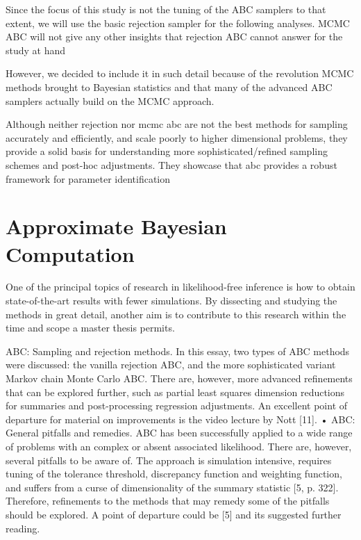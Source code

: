 Since the focus of this study is not the tuning of the ABC samplers to that extent, we will use the basic rejection sampler for the following analyses. MCMC ABC will not give any other insights that rejection ABC cannot answer for the study at hand 

However, we decided to include it in such detail because of the revolution MCMC methods brought to Bayesian statistics and that many of the advanced ABC samplers actually build on the MCMC approach. 

Although neither rejection nor mcmc abc are not the best methods for sampling accurately and efficiently, and scale poorly to higher dimensional problems, they provide a solid basis for understanding more sophisticated/refined sampling schemes and post-hoc adjustments. They showcase that abc provides a robust framework for parameter identification

\section{Approximate Bayesian Computation}

One of the principal topics of research in likelihood-free inference is how to obtain state-of-the-art results with fewer simulations. By dissecting and studying the methods in great detail, another aim is to contribute to this research within the time and scope a master thesis permits. 

ABC: Sampling and rejection methods. In this essay, two types of ABC methods were discussed: the vanilla rejection ABC, and the more sophisticated variant Markov chain Monte Carlo ABC. There are, however, more advanced refinements that can be explored further, such as partial least squares dimension reductions for summaries and post-processing regression adjustments. An excellent point of departure for material on improvements is the video lecture by Nott [11].
• ABC: General pitfalls and remedies. ABC has been successfully applied to a wide range of problems with an complex or absent associated likelihood. There are, however, several pitfalls to be aware of. The approach is simulation intensive, requires tuning of the tolerance threshold, discrepancy function and weighting function, and suffers from a curse of dimensionality of the summary statistic [5, p. 322]. Therefore, refinements to the methods that may remedy some of the pitfalls should be explored. A point of departure could be [5] and its suggested further reading. 

